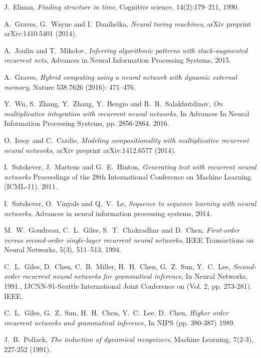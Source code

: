 \documentclass[english,letter paper,12pt,leqno]{article}
\theoremstyle{example}
\numberwithin{equation}{section}
\begin{document}

\providecommand{\bysame}{\leavevmode\hbox to3em{\hrulefill}\thinspace}
\providecommand{\href}[2]{#2}
\begin{thebibliography}{BHLS03}

J.~Elman, \textsl{Finding structure in time}, Cognitive science, 14(2):179–211, 1990.

A.~Graves, G.~Wayne and I.~Danihelka, \textsl{Neural turing machines}, arXiv preprint arXiv:1410.5401 (2014).

A.~Joulin and T.~Mikolov, \textsl{Inferring algorithmic patterns with stack-augmented recurrent nets}, Advances in Neural Information Processing Systems, 2015.

A.~Graves, \textsl{Hybrid computing using a neural network with dynamic external memory}, Nature 538.7626 (2016): 471--476.

Y.~Wu, S.~Zhang, Y.~Zhang, Y.~Bengio and R.~R.~Salakhutdinov, \textsl{On multiplicative integration with recurrent neural networks}, In Advances In Neural Information Processing Systems, pp. 2856-2864. 2016.

O.~Irsoy and C.~Cardie, \textsl{Modeling compositionality with multiplicative recurrent neural networks}, arXiv preprint arXiv:1412.6577 (2014).

I.~Sutskever, J.~Martens and G.~E.~Hinton, \textsl{Generating text with recurrent neural networks} Proceedings of the 28th International Conference on Machine Learning (ICML-11). 2011.

I.~Sutskever, O.~Vinyals and Q.~V.~Le, \textsl{Sequence to sequence learning with neural networks}, Advances in neural information processing systems, 2014.

M.~W.~Goudreau, C.~L.~Giles, S.~T.~Chakradhar and D.~Chen, \textsl{First-order versus second-order single-layer recurrent neural networks}, IEEE Transactions on Neural Networks, 5(3), 511--513, 1994.

C.~L.~Giles, D.~Chen, C.~B.~Miller, H.~H.~Chen, G.~Z.~Sun, Y.~C.~Lee, \textsl{Second-order recurrent neural networks for grammatical inference}, In Neural Networks, 1991., IJCNN-91-Seattle International Joint Conference on (Vol. 2, pp. 273-281). IEEE.

C.~L.~Giles, G.~Z.~Sun, H.~H.~Chen, Y.~C.~Lee, D.~Chen, \textsl{Higher order recurrent networks and grammatical inference}, In NIPS (pp. 380-387) 1989.

J.~B.~Pollack, \textsl{The induction of dynamical recognizers}, Machine Learning, 7(2-3), 227-252 (1991). 

\end{thebibliography}
\end{document}
